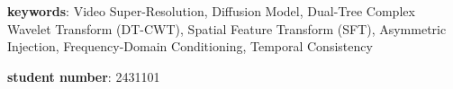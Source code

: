 \vfill
\begin{flushleft}
\begin{minipage}[t][22mm][b]{0.8\textwidth}
\noindent\makebox[\linewidth]{\rule{\linewidth}{1pt}}
{\bfseries keywords}: Video Super-Resolution, Diffusion Model, Dual-Tree Complex Wavelet Transform (DT-CWT), Spatial Feature Transform (SFT), Asymmetric Injection, Frequency-Domain Conditioning, Temporal Consistency

{\bfseries student number}: 2431101\\
\end{minipage}
\end{flushleft}
\clearpage
